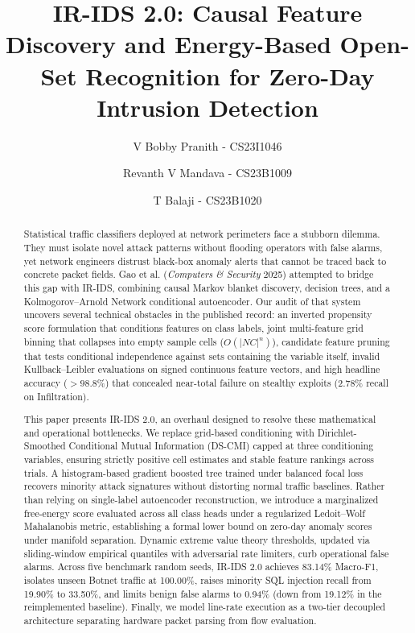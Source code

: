 \documentclass[5p,times,twocolumn]{elsarticle}
\begin{document}
\begin{frontmatter}

\title{IR-IDS 2.0: Causal Feature Discovery and Energy-Based Open-Set Recognition for Zero-Day Intrusion Detection}

\author[inst1]{V Bobby Pranith - CS23I1046}
\author[inst1]{Revanth V Mandava - CS23B1009}
\author[inst1]{T Balaji - CS23B1020}


\begin{abstract}
Statistical traffic classifiers deployed at network perimeters face a stubborn dilemma. They must isolate novel attack patterns without flooding operators with false alarms, yet network engineers distrust black-box anomaly alerts that cannot be traced back to concrete packet fields. Gao et al. (\textit{Computers \& Security} 2025) attempted to bridge this gap with IR-IDS, combining causal Markov blanket discovery, decision trees, and a Kolmogorov--Arnold Network conditional autoencoder. Our audit of that system uncovers several technical obstacles in the published record: an inverted propensity score formulation that conditions features on class labels, joint multi-feature grid binning that collapses into empty sample cells ($O(|NC|^n)$), candidate feature pruning that tests conditional independence against sets containing the variable itself, invalid Kullback--Leibler evaluations on signed continuous feature vectors, and high headline accuracy ($>98.8\%$) that concealed near-total failure on stealthy exploits (2.78\% recall on Infiltration).

This paper presents IR-IDS 2.0, an overhaul designed to resolve these mathematical and operational bottlenecks. We replace grid-based conditioning with Dirichlet-Smoothed Conditional Mutual Information (DS-CMI) capped at three conditioning variables, ensuring strictly positive cell estimates and stable feature rankings across trials. A histogram-based gradient boosted tree trained under balanced focal loss recovers minority attack signatures without distorting normal traffic baselines. Rather than relying on single-label autoencoder reconstruction, we introduce a marginalized free-energy score evaluated across all class heads under a regularized Ledoit--Wolf Mahalanobis metric, establishing a formal lower bound on zero-day anomaly scores under manifold separation. Dynamic extreme value theory thresholds, updated via sliding-window empirical quantiles with adversarial rate limiters, curb operational false alarms. Across five benchmark random seeds, IR-IDS 2.0 achieves 83.14\% Macro-F1, isolates unseen Botnet traffic at 100.00\%, raises minority SQL injection recall from 19.90\% to 33.50\%, and limits benign false alarms to 0.94\% (down from 19.12\% in the reimplemented baseline). Finally, we model line-rate execution as a two-tier decoupled architecture separating hardware packet parsing from flow evaluation.
\end{abstract}


\end{frontmatter}
\end{document}
